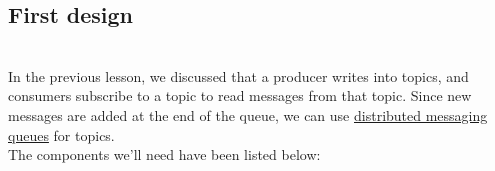 

\subsection{First design}\label{Iu3pxhyrG3uS_5Reopgel}
\\
In the previous lesson, we discussed that a producer writes into topics, and consumers subscribe to a topic to read messages from that topic. Since new messages are added at the end of the queue, we can use \href{https://www.educative.io/courses/grokking-the-system-design-interview/system-design-the-distributed-messaging-queue}{distributed messaging queues} for topics.
\\
The components we'll need have been listed below:

